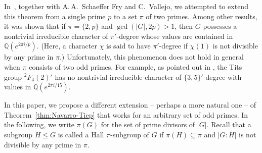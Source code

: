 \documentclass[12pt]{amsart}
\theoremstyle{definition}
\numberwithin{equation}{section}
\newcommand{\QQ}{{\mathbb Q}}
\begin{document}
In~\cite{GHSV21}, together with A.\,A.~Schaeffer Fry and C.~Vallejo,
we attempted to extend this theorem from a single prime $p$ to a set
$\pi$ of two primes. Among other results, it was shown that %
if
$\pi=\{2,p\}$ and $\gcd(|G|,2p)>1$, then $G$ possesses a nontrivial
irreducible character of $\pi'$-degree whose values are contained in
$\QQ(e^{2\pi i/p})$. (Here, a character $\chi$ is said to have
$\pi'$-degree if $\chi(1)$ is not divisible by any prime in %
$\pi$.)
Unfortunately, this phenomenon does not hold in general when $\pi$
consists of two odd primes. For example, as pointed out in
\cite[Proposition~4.1]{GHSV21}, the Tits group ${}^2F_4(2)'$ has no
nontrivial irreducible character of %
$\{3,5\}'$-degree with %
values in
$\QQ(e^{2\pi i/15})$.

In this paper, we propose a different extension -- perhaps a more
natural one -- of Theorem~\ref{thm:Navarro-Tiep} that works for
an arbitrary set of odd primes. In the following, we write $\pi(G)$
for the set of prime divisors of $|G|$. Recall that a subgroup $H\le
G$ is called %
a Hall $\pi$-subgroup of %
$G$ %
if $\pi(H)\subseteq \pi$
and $|G:H|$ is %
not divisible by any prime in $\pi$.
\end{document}
